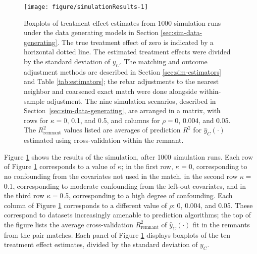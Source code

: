 \documentclass[12pt]{article}\usepackage[]{graphicx}\usepackage[]{color}
\makeatletter
\def\maxwidth{ %
  \ifdim\Gin@nat@width>\linewidth
    \linewidth
  \else
    \Gin@nat@width
  \fi
}
\newenvironment{knitrout}{}{} %
\newcommand{\algorithm}{\hat{y}_C(\cdot)}
\makeatother
\begin{document}
\begin{figure}
\centering
\begin{knitrout}
\color{fgcolor}
\texttt{[image: figure/simulationResults-1]} 

\end{knitrout}
\caption{Boxplots of treatment effect estimates from 1000
  simulation runs under the data generating models in Section
  \ref{sec:sim-data-generating}. The true treatment effect of zero is indicated by a
  horizontal dotted line. The estimated treatment effects were
  divided by the standard deviation of $y_C$. %
  The matching and outcome adjustment methods are described in Section
  \ref{sec:sim-estimators} and Table \ref{tab:estimators}; the rebar
  adjustments to the nearest neighbor and coarsened exact match were
  done alongside within-sample adjustment.%
The nine simulation scenarios, described in
Section~\ref{sec:sim-data-generating}, are arranged in a matrix, with
rows for $\kappa=$0, 0.1, and 0.5,
and columns for $\rho=$0, 0.004, and
0.05. %
The $R^2_{\text{remnant}}$ values listed are averages of prediction $R^2$ for $\algorithm$ estimated using cross-validation within the remnant.}
\label{fig:simulationResults}
\end{figure}

Figure \ref{fig:simulationResults} shows the results of the simulation, after 1000 simulation runs.
Each row of Figure \ref{fig:simulationResults} corresponds to a value of $\kappa$; in the first row, $\kappa=$0, corresponding to no confounding from the covariates not used in the match, in the second row $\kappa=$0.1, corresponding to moderate confounding from the left-out covariates, and in the third row $\kappa=$0.5, corresponding to a high degree of confounding.
Each column of Figure \ref{fig:simulationResults} corresponds to a different value of $\rho$: 0, 0.004, and 0.05.
These correspond to datasets increasingly amenable to prediction
algorithms; the top of the figure lists the average cross-validation
$R^2_{\text{remnant}}$ of $\algorithm$ fit in the remnants from the
pair matches.
Each panel of Figure \ref{fig:simulationResults} displays boxplots of the
ten treatment effect estimates, divided by the standard deviation of
$y_C$.
\end{document}
